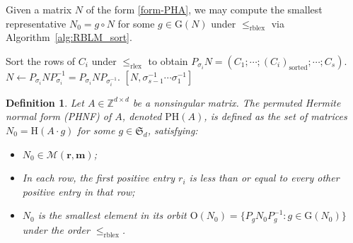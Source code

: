 \documentclass[reqno, 12pt]{article}
\theoremstyle{mydefinition}
\newtheorem{dfn}[thm]{Definition}
\theoremstyle{myremark}
\numberwithin{algorithm}{section}
\newcommand{\h}{{\mathrm{H}}}
\begin{document}
Given a matrix $N$ of the form \eqref{form-PHA}, we may compute the smallest representative $N_{0} = g \circ N$ for some $g \in \mathrm{G}(N)$ under $\leq_{\text{rblex}}$ via Algorithm~\ref{alg:RBLM_sort}.

\begin{algorithm}[h]
\caption{Reverse-Block Lexicographic Matrix Sort (RBLM Sort)}
\label{alg:RBLM_sort}
\begin{algorithmic}[1]
       \State Sort the rows of $C_i$ under $\leq_\text{rlex}$ to obtain $P_{\sigma_i}N = (C_1 ; \cdots ; (C_i)_{\text{sorted}}; \cdots ; C_s)$.
       \State $N \gets P_{\sigma_i} N P^{-1}_{\sigma_i} = P_{\sigma_i} N P_{\sigma^{-1}_i}$.
    \EndFor
    \State \Return $[N, \sigma^{-1}_{s-1} \cdots \sigma^{-1}_{1}]$
\EndProcedure
\end{algorithmic}
\end{algorithm}


\begin{dfn}
Let $A \in \mathbb{Z}^{d \times d}$ be a nonsingular matrix. The \emph{permuted Hermite normal form (PHNF)} of $A$, denoted $\mathrm{PH}(A)$,
is defined as the set of matrices $N_0 = \h(A \cdot g)$ for some $g \in \mathfrak{S}_d$, satisfying:
\begin{itemize}
\item $N_0 \in \mathcal{M}(\mathbf{r}, \mathbf{m})$;
\item In each row, the first positive entry $r_i$ is less than or equal to every other positive entry in that row;
\item $N_0$ is the smallest element in its orbit $\mathrm{O}(N_0) = \{P_g N_0 P_g^{-1} : g \in \mathrm{G}(N_0)\}$ under the order $\leq_{\text{rblex}}$.
\end{itemize}
\end{dfn}
\end{document}
